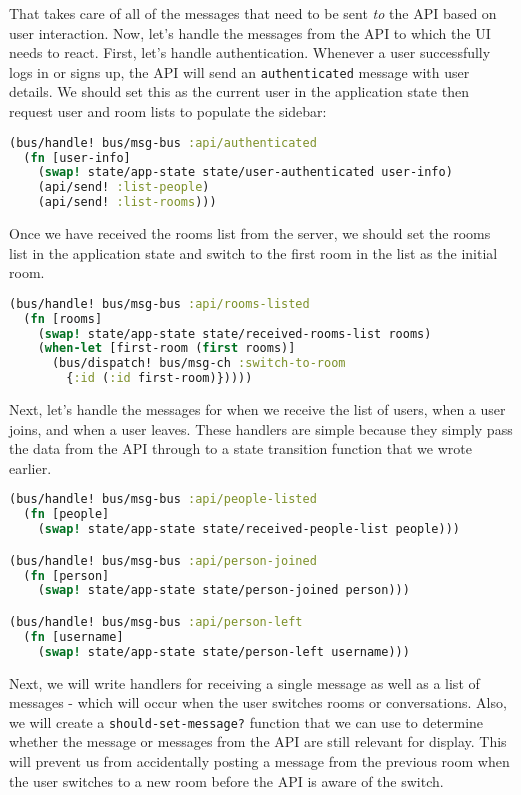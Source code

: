 \documentclass[10pt,twoside,openright]{memoir}
\begin{document}
That takes care of all of the messages that need to be sent \emph{to}
the API based on user interaction. Now, let's handle the messages from
the API to which the UI needs to react. First, let's handle
authentication. Whenever a user successfully logs in or signs up, the
API will send an \texttt{authenticated} message with user details. We
should set this as the current user in the application state then
request user and room lists to populate the sidebar:

\begin{lstlisting}[language=Clojure]
(bus/handle! bus/msg-bus :api/authenticated
  (fn [user-info]
    (swap! state/app-state state/user-authenticated user-info)
    (api/send! :list-people)
    (api/send! :list-rooms)))
\end{lstlisting}

Once we have received the rooms list from the server, we should set the
rooms list in the application state and switch to the first room in the
list as the initial room.

\begin{lstlisting}[language=Clojure]
(bus/handle! bus/msg-bus :api/rooms-listed
  (fn [rooms]
    (swap! state/app-state state/received-rooms-list rooms)
    (when-let [first-room (first rooms)]
      (bus/dispatch! bus/msg-ch :switch-to-room
        {:id (:id first-room)}))))
\end{lstlisting}

Next, let's handle the messages for when we receive the list of users,
when a user joins, and when a user leaves. These handlers are simple
because they simply pass the data from the API through to a state
transition function that we wrote earlier.

\begin{lstlisting}[language=Clojure]
(bus/handle! bus/msg-bus :api/people-listed
  (fn [people]
    (swap! state/app-state state/received-people-list people)))

(bus/handle! bus/msg-bus :api/person-joined
  (fn [person]
    (swap! state/app-state state/person-joined person)))

(bus/handle! bus/msg-bus :api/person-left
  (fn [username]
    (swap! state/app-state state/person-left username)))
\end{lstlisting}

Next, we will write handlers for receiving a single message as well as a
list of messages - which will occur when the user switches rooms or
conversations. Also, we will create a \texttt{should-set-message?}
function that we can use to determine whether the message or messages
from the API are still relevant for display. This will prevent us from
accidentally posting a message from the previous room when the user
switches to a new room before the API is aware of the switch.
\end{document}
